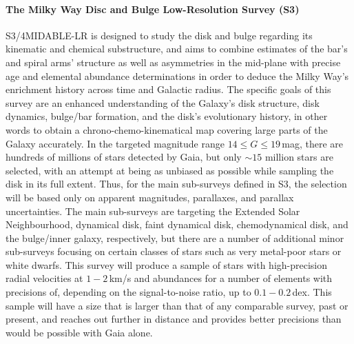 \documentclass[a4paper,11pt]{article}
\begin{document}
\paragraph{The Milky Way Disc and Bulge Low-Resolution Survey (S3)}
S3/4MIDABLE-LR \citep{4mosts3} is designed to study the disk and bulge regarding its kinematic and chemical substructure, and aims to combine estimates of the bar's and spiral arms' structure as well as asymmetries in the mid-plane with precise age and elemental abundance determinations in order to deduce the Milky Way's enrichment history across time and Galactic radius. The specific goals of this survey are an enhanced understanding of the Galaxy's disk structure, disk dynamics, bulge/bar formation, and the disk's evolutionary history, in other words to obtain a chrono-chemo-kinematical map covering large parts of the Galaxy accurately. In the targeted magnitude range $14\leq G\leq19$\,mag, there are hundreds of millions of stars detected by Gaia, but only ${\sim}15$ million stars are selected, with an attempt at being as unbiased as possible while sampling the disk in its full extent. Thus, for the main sub-surveys defined in S3, the selection will be based only on apparent magnitudes, parallaxes, and parallax uncertainties. The main sub-surveys are targeting the Extended Solar Neighbourhood, dynamical disk, faint dynamical disk, chemodynamical disk, and the bulge/inner galaxy, respectively, but there are a number of additional minor sub-surveys focusing on certain classes of stars such as very metal-poor stars or white dwarfs. This survey will produce a sample of stars with high-precision radial velocities at $1-2$\,km/s and abundances for a number of elements with precisions of, depending on the signal-to-noise ratio, up to $0.1-0.2$\,dex. This sample will have a size that is larger than that of any comparable survey, past or present, and reaches out further in distance and provides better precisions than would be possible with Gaia alone.
%
\end{document}
